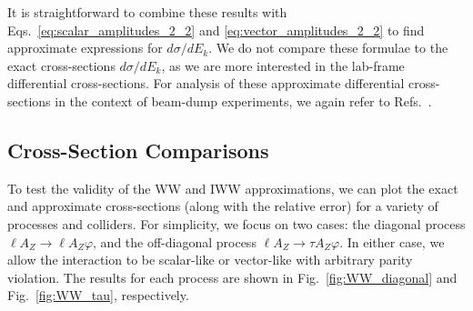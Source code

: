 It is straightforward to combine these results with Eqs.~\ref{eq:scalar_amplitudes_2_2} and \ref{eq:vector_amplitudes_2_2} to find approximate expressions for $d\sigma/dE_k$. We do not compare these formulae to the exact cross-sections $d\sigma/dE_k$, as we are more interested in the lab-frame differential cross-sections. For analysis of these approximate differential cross-sections in the context of beam-dump experiments, we again refer to Refs.~\cite{Liu:2016mqv,Liu:2017htz,Chen:2017awl}.
\subsection{Cross-Section Comparisons}\label{sec:cx_comparison}

To test the validity of the WW and IWW approximations, we can plot the exact and approximate cross-sections (along with the relative error) for a variety of processes and colliders. For simplicity, we focus on two cases: the diagonal process $\ell A_Z \longrightarrow \ell A_Z \varphi$, and the off-diagonal process $\ell A_Z \longrightarrow \tau A_Z \varphi$. In either case, we allow the interaction to be scalar-like or vector-like with arbitrary parity violation. The results for each process are shown in Fig.~\ref{fig:WW_diagonal} and Fig.~\ref{fig:WW_tau}, respectively.

